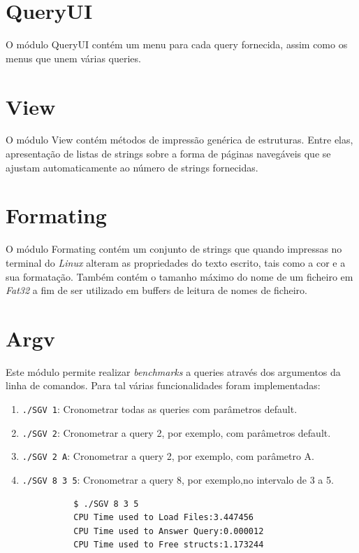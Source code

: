 \documentclass[a4paper]{report}
\begin{document}
\section{QueryUI}

O módulo QueryUI contém um menu para cada query fornecida, assim como os menus que unem várias queries.


\section{View}

O módulo View contém métodos de impressão genérica de estruturas. Entre elas,
apresentação de listas de strings sobre a forma de páginas navegáveis que se ajustam
automaticamente ao número de strings fornecidas.

\section{Formating}

O módulo Formating contém um conjunto de strings que quando impressas no terminal do
\textit{Linux} alteram as propriedades do texto escrito, tais como a cor e a sua formatação.
Também contém o tamanho máximo do nome de um ficheiro em \textit{Fat32} a fim de ser utilizado
em buffers de leitura de nomes de ficheiro.

\section{Argv}

Este módulo permite realizar \textit{benchmarks} a queries através dos argumentos da linha de comandos.
Para tal várias funcionalidades foram implementadas:
\begin{enumerate}
    \item \texttt{./SGV 1}: Cronometrar todas as queries com parâmetros default.
    \item \texttt{./SGV 2}: Cronometrar a query 2, por exemplo, com parâmetros default.
    \item \texttt{./SGV 2 A}: Cronometrar a query 2, por exemplo, com parâmetro A.
    \item \texttt{./SGV 8 3 5}: Cronometrar a query 8, por exemplo,no intervalo de 3 a 5.
\end{enumerate}

\begin{figure}[H]
    \begin{center}
        \begin{verbatim}
        $ ./SGV 8 3 5
        CPU Time used to Load Files:3.447456
        CPU Time used to Answer Query:0.000012
        CPU Time used to Free structs:1.173244
        \end{verbatim}
    \end{center}
\end{figure}
\end{document}
